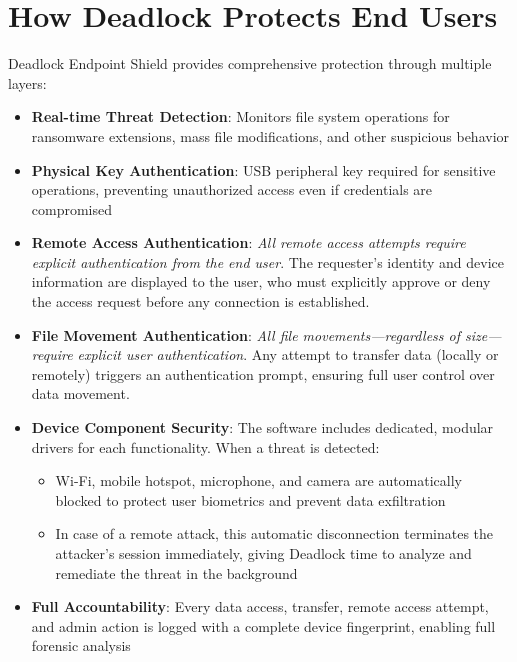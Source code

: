 \documentclass[12pt,letterpaper]{report}
\begin{document}
\section{How Deadlock Protects End Users}
Deadlock Endpoint Shield provides comprehensive protection through multiple layers:
\begin{itemize}
    \item \textbf{Real-time Threat Detection}: Monitors file system operations for ransomware extensions, mass file modifications, and other suspicious behavior
    \item \textbf{Physical Key Authentication}: USB peripheral key required for sensitive operations, preventing unauthorized access even if credentials are compromised
    \item \textbf{Remote Access Authentication}: \textit{All remote access attempts require explicit authentication from the end user}. The requester's identity and device information are displayed to the user, who must explicitly approve or deny the access request before any connection is established.
    \item \textbf{File Movement Authentication}: \textit{All file movements---regardless of size---require explicit user authentication}. Any attempt to transfer data (locally or remotely) triggers an authentication prompt, ensuring full user control over data movement.
    \item \textbf{Device Component Security}: The software includes dedicated, modular drivers for each functionality. When a threat is detected:
          \begin{itemize}
              \item Wi-Fi, mobile hotspot, microphone, and camera are automatically blocked to protect user biometrics and prevent data exfiltration
              \item In case of a remote attack, this automatic disconnection terminates the attacker's session immediately, giving Deadlock time to analyze and remediate the threat in the background
          \end{itemize}
    \item \textbf{Full Accountability}: Every data access, transfer, remote access attempt, and admin action is logged with a complete device fingerprint, enabling full forensic analysis
\end{itemize}
\end{document}
